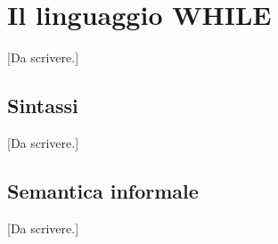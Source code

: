 \chapter{Il linguaggio WHILE}

[Da scrivere.]

\section{Sintassi}

[Da scrivere.]

\section{Semantica informale}

[Da scrivere.]
